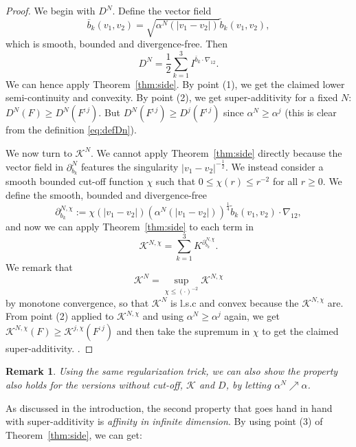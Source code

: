 \documentclass[11pt,a4paper]{article}
\theoremstyle{definition}
\theoremstyle{plain}
\newtheorem{remark}[defi]{Remark}
\begin{document}
\begin{proof}
    We begin with $D^N$. Define the vector field
    \begin{equation}
    \label{eq:defbbark}
        \bar{b}_k(v_1,v_2)=\sqrt{\alpha^N(\vert v_1-v_2\vert)}\tilde{b}_k(v_1,v_2),
    \end{equation}
    which is smooth, bounded and divergence-free.
    Then
    $$D^N=\frac{1}{2}\sum_{k=1}^3 I^{\bar{b}_k\cdot\nabla_{12}}.$$
    We can hence apply Theorem~\ref{thm:side}. By point (1), we get the claimed lower semi-continuity and convexity. By point (2), we get super-additivity for a fixed $N$:
    $D^N(F)\geq D^N(F^{:j})$. But $ D^N(F^{:j})\geq  D^j(F^{:j})$ since $\alpha^N\geq \alpha^j$ (this is clear from the definition \ref{eq:defDn}).
    
    We now turn to $\mathcal{K}^{N}$. We cannot apply Theorem~\ref{thm:side} directly because the vector field in $\partial^N_{b_k}$ features the singularity $\vert v_1-v_2\vert^{-\frac{1}{2}}$. We instead consider a smooth bounded cut-off function $\chi$ such that $0\leq \chi(r)\leq r^{-2}$ for all $r\geq 0$. We define the smooth, bounded and divergence-free
    $$\partial^{N,\chi}_{b_k}:=\chi(\vert v_1-v_2\vert) (\alpha^N(\vert v_1-v_2\vert ))^{\frac{1}{4}}\tilde{b}_k(v_1,v_2)\cdot \nabla_{12},$$
    and now we can apply Theorem~\ref{thm:side} to each term in
    $$\mathcal{K}^{N,\chi}=\sum_{k=1}^3 K^{\partial^{N,\chi}_{b_k}}.$$
    We remark that
    $$\mathcal{K}^N=\sup_{\chi\leq (\cdot)^{-2}}\mathcal{K}^{N,\chi}$$
    by monotone convergence, so that $\mathcal{K}^N$ is l.s.c and convex because the $\mathcal{K}^{N,\chi}$ are. From point (2) applied to $\mathcal{K}^{N,\chi}$ and using $\alpha^N\geq \alpha^j$ again, we get
    $\mathcal{K}^{N,\chi}(F)\geq \mathcal{K}^{j,\chi}(F^{:j})$ and then take the supremum in $\chi$ to get the claimed super-additivity. .
\end{proof}

\begin{remark}
    Using the same regularization trick, we can also show the property also holds for the versions without cut-off, $\mathcal{K}$ and $D$, by letting $\alpha^N \nearrow\alpha$.
\end{remark}

As discussed in the introduction, the second property that goes hand in hand with super-additivity is \textit{affinity in infinite dimension}. By using point (3) of Theorem~\ref{thm:side}, we can get:
\end{document}
